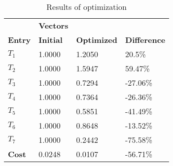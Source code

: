 \begin{table}[H]
\centering
\begin{tabular}{llll}
\textbf{}      & \cellcolor[HTML]{EFEFEF}\textbf{Vectors} & \textbf{} & \textbf{}         \\
\rowcolor[HTML]{EFEFEF} 
\textbf{Entry} & \textbf{Initial} & \textbf{Optimized} & \textbf{Difference} \\
$T_1$ & 1.0000 & 1.2050 & 20.5\% \\ 
$T_2$ & 1.0000 & 1.5947 & 59.47\% \\ 
$T_3$ & 1.0000 & 0.7294 & -27.06\% \\ 
$T_4$ & 1.0000 & 0.7364 & -26.36\% \\ 
$T_5$ & 1.0000 & 0.5851 & -41.49\% \\ 
$T_6$ & 1.0000 & 0.8648 & -13.52\% \\ 
$T_7$ & 1.0000 & 0.2442 & -75.58\% \\ 
\rowcolor[HTML]{EFEFEF} 
\textbf{Cost}  & 0.0248 & 0.0107 & -56.71\% \\ 
\end{tabular}
\caption{Results of optimization}
\label{tab:OptimizationAnalysis}
\end{table}